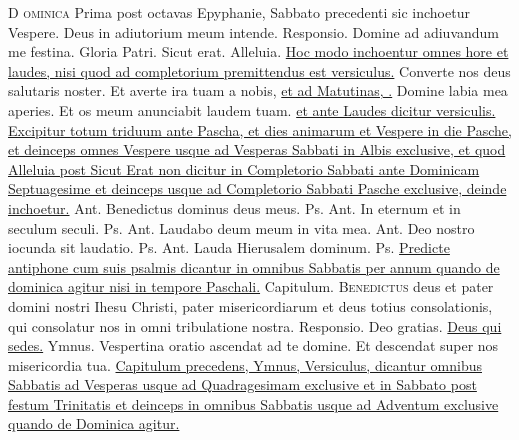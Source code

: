 \begin{multicols*}{2}
\lettrine[lines=2]{\zallmancaps \color{Blue} D}{\color{Red} ominica} {\color{Red} Prima post octavas Epyphanie, Sabbato precedenti sic inchoetur Vespere.} Deus in adiutorium meum intende. {\color{Red} Responsio.} Domine ad adiuvandum me festina. Gloria Patri. Sicut erat. Alleluia. \ul{Hoc modo inchoentur omnes hore et laudes, nisi quod ad completorium premittendus est versiculus.} Converte nos deus salutaris noster. Et averte ira tuam a nobis, \ul{et ad Matutinas, \Vbar .} Domine labia mea aperies. Et os meum anunciabit laudem tuam. \ul{et ante Laudes dicitur versiculis. Excipitur totum triduum ante Pascha, et dies animarum et Vespere in die Pasche, et deinceps omnes Vespere usque ad Vesperas Sabbati in Albis exclusive, et quod Alleluia post Sicut Erat non dicitur in Completorio Sabbati ante Dominicam Septuagesime et deinceps usque ad Completorio Sabbati Pasche exclusive, deinde inchoetur.} {\color{Red} Ant.} Benedictus dominus deus meus. {\color{Red} Ps.}  {\color{Red} Ant.} In eternum et in seculum seculi. {\color{Red} Ps.}  {\color{Red} Ant.} Laudabo deum meum in vita mea.  {\color{Red} Ant.} Deo nostro iocunda sit laudatio. {\color{Red} Ps.}  {\color{Red} Ant.} Lauda Hierusalem dominum. {\color{Red} Ps.} 
\newline \ul{Predicte antiphone cum suis psalmis dicantur in omnibus Sabbatis per annum quando de dominica agitur nisi in tempore Paschali.} {\color{Red} Capitulum.}
\lettrine[lines=2]{\zallmancaps \color{Red} B}{enedictus} deus et pater domini nostri Ihesu Christi, pater misericordiarum et deus totius consolationis, qui consolatur nos in omni tribulatione nostra. {\color{Red} Responsio.} Deo gratias. \R \hyperlink{deus-qui-sedes}{Deus qui sedes.} {\color{Red} Ymnus.}
\newline \V Vespertina oratio ascendat ad te domine.
\newline \R Et descendat super nos misericordia tua.
\newline \ul{Capitulum precedens, Ymnus, Versiculus, dicantur omnibus Sabbatis ad Vesperas usque ad Quadragesimam exclusive et in Sabbato post festum Trinitatis et deinceps in omnibus Sabbatis usque ad Adventum exclusive quando de Dominica agitur.}

\end{multicols*}
